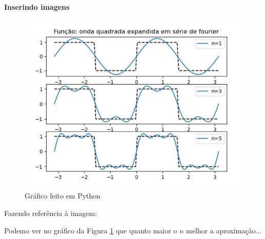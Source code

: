 \documentclass[a4paper, 12pt]{article}
\begin{document}
\begin{center}
	\textbf{Inserindo imagens}
\end{center}

\begin{figure}[H] %
	\centering %
	\includegraphics[scale=0.5]{fig1.png} %
	\caption{Gráfico feito em Python} %
	\label{grafico-python}
\end{figure}

Fazendo referência à imagem:

Podemo ver no gráfico da Figura \ref{grafico-python} que quanto maior o $n$ melhor a aproximação...
\end{document}
